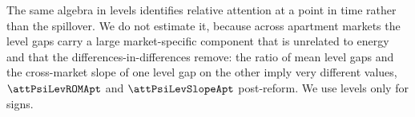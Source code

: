 The same algebra in levels identifies relative attention at a point in time rather than the spillover. We do not estimate it, because across apartment markets the level gaps carry a large market-specific component that is unrelated to energy and that the differences-in-differences remove: the ratio of mean level gaps and the cross-market slope of one level gap on the other imply very different values, $\attPsiLevROMApt$ and $\attPsiLevSlopeApt$ post-reform. We use levels only for signs.
